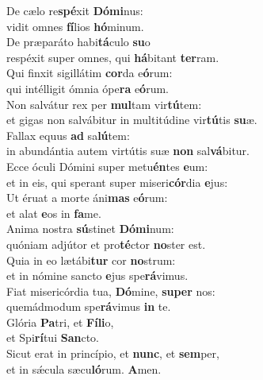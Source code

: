\evenverse De cælo re\textbf{spé}xit \textbf{Dó}\textbf{mi}nus:~\*\\
\evenverse vidit omnes \textbf{fí}lios \textbf{hó}minum.\\
\oddverse De præparáto habi\textbf{tá}culo \textbf{su}o~\*\\
\oddverse respéxit super omnes, qui \textbf{há}bitant \textbf{ter}ram.\\
\evenverse Qui finxit sigillátim \textbf{cor}da e\textbf{ó}rum:~\*\\
\evenverse qui intélligit ómnia ópe\textbf{ra} e\textbf{ó}rum.\\
\oddverse Non salvátur rex per \textbf{mul}tam vir\textbf{tú}tem:~\*\\
\oddverse et gigas non salvábitur in multitúdine vir\textbf{tú}tis \textbf{su}æ.\\
\evenverse Fallax equus \textbf{ad} sa\textbf{lú}tem:~\*\\
\evenverse in abundántia autem virtútis suæ \textbf{non} sal\textbf{vá}bitur.\\
\oddverse Ecce óculi Dómini super metu\textbf{én}tes \textbf{e}um:~\*\\
\oddverse et in eis, qui sperant super miseri\textbf{cór}dia \textbf{e}jus:\\
\evenverse Ut éruat a morte áni\textbf{mas} e\textbf{ó}rum:~\*\\
\evenverse et alat \textbf{e}os in \textbf{fa}me.\\
\oddverse Anima nostra \textbf{sú}stinet \textbf{Dó}\textbf{mi}num:~\*\\
\oddverse quóniam adjútor et pro\textbf{té}ctor \textbf{no}ster est.\\
\evenverse Quia in eo lætábi\textbf{tur} cor \textbf{no}strum:~\*\\
\evenverse et in nómine sancto \textbf{e}jus spe\textbf{rá}vimus.\\
\oddverse Fiat misericórdia tua, \textbf{Dó}mine, \textbf{su}\textbf{per} nos:~\*\\
\oddverse quemádmodum spe\textbf{rá}vimus \textbf{in} te.\\
\evenverse Glória \textbf{Pa}tri, et \textbf{Fí}\textbf{li}o,~\*\\
\evenverse et Spi\textbf{rí}tui \textbf{San}cto.\\
\oddverse Sicut erat in princípio, et \textbf{nunc}, et \textbf{sem}per,~\*\\
\oddverse et in sǽcula sæcu\textbf{ló}rum. \textbf{A}men.\\
